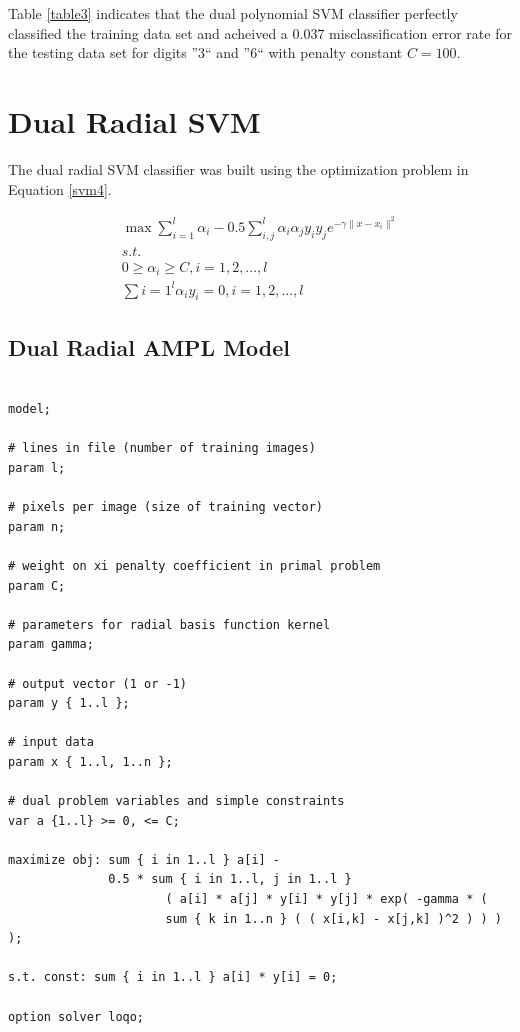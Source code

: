 \documentclass{article}
\begin{document}
Table \ref{table3} indicates that the dual polynomial SVM classifier perfectly classified the training data set and acheived a \(0.037\) misclassification error rate for the testing data set for digits ''3`` and ''6`` with penalty constant \(C=100\).

\section{Dual Radial SVM}\label{model4}

The dual radial SVM classifier was built using the optimization problem in Equation \ref{svm4}.

\begin{equation}\label{svm4}
\begin{split}
\max \sum_{i=1}^l \alpha_i - 0.5 \sum_{i,j}^l \alpha_i \alpha_j y_i y_j e^{-\gamma \| x - x_i \|^2 } \\
s.t. \\
0 \ge \alpha_i \ge C , i = 1,2,...,l \\
\sum{i=1}^l \alpha_i y_i = 0 , i = 1,2,...,l
\end{split}
\end{equation}

\subsection{Dual Radial AMPL Model}

\begin{verbatim}

model;

# lines in file (number of training images)
param l;

# pixels per image (size of training vector)
param n;

# weight on xi penalty coefficient in primal problem
param C;

# parameters for radial basis function kernel
param gamma;

# output vector (1 or -1)
param y { 1..l };

# input data
param x { 1..l, 1..n };

# dual problem variables and simple constraints
var a {1..l} >= 0, <= C;

maximize obj: sum { i in 1..l } a[i] -
              0.5 * sum { i in 1..l, j in 1..l }
                      ( a[i] * a[j] * y[i] * y[j] * exp( -gamma * ( 
                      sum { k in 1..n } ( ( x[i,k] - x[j,k] )^2 ) ) ) );

s.t. const: sum { i in 1..l } a[i] * y[i] = 0;

option solver loqo;

\end{verbatim}
\end{document}
